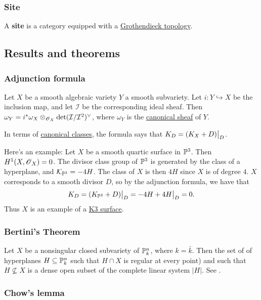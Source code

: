 \documentclass[11pt, english]{article}
\begin{document}
\subsubsection{Site}
\label{site}

A \textbf{site} is a category equipped with a \hyperref[grothendiecktopology]{Grothendieck topology}.


\subsection{Results and theorems}
\subsubsection{Adjunction formula}
\label{adjunction}

Let $X$ be a smooth algebraic variety $Y$ a smooth subvariety. Let $i:Y \hookrightarrow X$ be the inclusion map, and let $\mathcal I$ be the corresponding ideal sheaf. Then $\omega_Y = i^\ast \omega_X \otimes_{\operatorname{\mathscr{O}}_X} \det(\mathcal I/\mathcal I^2)^\vee$, where $\omega_Y$ is the \hyperref[canonicalsheaf]{canonical sheaf} of $Y$.

In terms of \hyperref[canonicaldivisor]{canonical classes}, the formula says that $K_D = \restr{(K_X + D)}{D}$. 

Here's an example: Let $X$ be a smooth quartic surface in $\mathbb{P}^3$. Then $H^1(X,\operatorname{\mathscr{O}}_X)=0$. The divisor class group of $\mathbb{P}^3$ is generated by the class of a hyperplane, and $\mathcal K_{\mathbb{P}^3}=-4H$. The class of $X$ is then $4H$ since $X$ is of degree $4$. $X$ corresponds to a smooth divisor $D$, so by the adjunction formula, we have that
\[
K_D = \restr{(K_{\PP^3}+D)}{D} = \restr{-4H+4H}{D} = 0.
\]
Thus $X$ is an example of a \hyperref[k3]{K3 surface}. 


\subsubsection{Bertini's Theorem}
\label{bertini}
Let $X$ be a nonsingular closed subvariety of $\mathbb{P}_k^n$, where $k=\bar k$. Then the set of of hyperplanes $H \subseteq \mathbb{P}_k^n$ such that $H \cap X$ is regular at every point) and such that $H\not  \subseteq X$ is a dense open subset of the complete linear system $|H|$. See \cite[Thm II.8.18]{hartshorne}.

\subsubsection{Chow's lemma}
\label{chowslemma}
\end{document}
